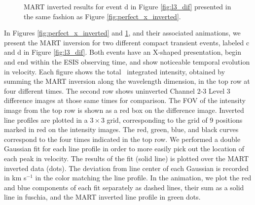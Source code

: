        \begin{figure}[htb!]
    	\centering
    	\caption{MART inverted results for event d in Figure \ref{fig:l3_dif} presented in the same fashion as Figure \ref{fig:perfect_x_inverted}.}
    	\label{fig:other_x_inverted}
    	\end{figure}
    	
    	In Figures \ref{fig:perfect_x_inverted} and \ref{fig:other_x_inverted}, and their associated animations, we present the MART inversion for two different compact transient events, labeled c and d in Figure \ref{fig:l3_dif}.
    	Both events have an X-shaped presentation, begin and end within the ESIS observing time, and show noticeable temporal evolution in velocity.
		Each figure shows the total \ov \ integrated intensity, %
		obtained by summing the MART inversion
		along the wavelength dimension, 
		in the top row  at four different times. 
		The second row shows uninverted Channel 2-3 Level 3 difference images at those same times for comparison.
		The FOV of the intensity image from the top row is shown as a red box on the difference image. %
		Inverted \ov line profiles are plotted in a $3\times 3$ grid, corresponding to the grid of 9 positions marked
		in red on the intensity images. The red, green, blue, and black curves correspond to the four times indicated in
		the top row.
		We performed a double Gaussian fit for each line profile in order to more easily pick out the location of each peak in velocity.
		The results of the fit (solid line) is plotted over the MART inverted data (dots).
		The deviation from line center of each Gaussian is recorded in km s$^{-1}$ in the color matching the line profile.
		In the animation, we plot the red and blue components of each fit separately as dashed lines, their sum as a solid line in fuschia, and the MART inverted line profile in  green dots.
		
